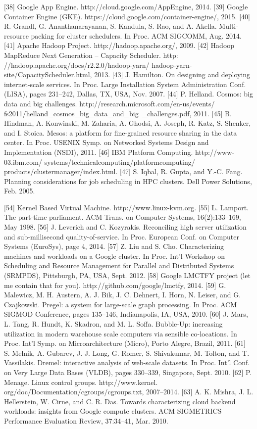 [38] Google App Engine.
http://cloud.google.com/AppEngine, 2014.
[39] Google Container Engine (GKE).
https://cloud.google.com/container-engine/,
2015.
[40] R. Grandl, G. Ananthanarayanan, S. Kandula, S. Rao, and
A. Akella. Multi-resource packing for cluster schedulers. In
Proc. ACM SIGCOMM, Aug. 2014.
[41] Apache Hadoop Project. http://hadoop.apache.org/,
2009.
[42] Hadoop MapReduce Next Generation – Capacity Scheduler.
http:
//hadoop.apache.org/docs/r2.2.0/hadoop-yarn/
hadoop-yarn-site/CapacityScheduler.html, 2013.
[43] J. Hamilton. On designing and deploying internet-scale
services. In Proc. Large Installation System Administration
Conf. (LISA), pages 231–242, Dallas, TX, USA, Nov. 2007.
[44] P. Helland. Cosmos: big data and big challenges.
http://research.microsoft.com/en-us/events/
fs2011/helland\_cosmos\_big\_data\_and\_big\
_challenges.pdf, 2011.
[45] B. Hindman, A. Konwinski, M. Zaharia, A. Ghodsi,
A. Joseph, R. Katz, S. Shenker, and I. Stoica. Mesos: a
platform for fine-grained resource sharing in the data center.
In Proc. USENIX Symp. on Networked Systems Design and
Implementation (NSDI), 2011.
[46] IBM Platform Computing. http://www-03.ibm.com/
systems/technicalcomputing/platformcomputing/
products/clustermanager/index.html.
[47] S. Iqbal, R. Gupta, and Y.-C. Fang. Planning considerations
for job scheduling in HPC clusters. Dell Power Solutions,
Feb. 2005.

[54] Kernel Based Virtual Machine.
http://www.linux-kvm.org.
[55] L. Lamport. The part-time parliament. ACM Trans. on
Computer Systems, 16(2):133–169, May 1998.
[56] J. Leverich and C. Kozyrakis. Reconciling high server
utilization and sub-millisecond quality-of-service. In Proc.
European Conf. on Computer Systems (EuroSys), page 4,
2014.
[57] Z. Liu and S. Cho. Characterizing machines and workloads
on a Google cluster. In Proc. Int’l Workshop on Scheduling
and Resource Management for Parallel and Distributed
Systems (SRMPDS), Pittsburgh, PA, USA, Sept. 2012.
[58] Google LMCTFY project (let me contain that for you).
http://github.com/google/lmctfy, 2014.
[59] G. Malewicz, M. H. Austern, A. J. Bik, J. C. Dehnert,
I. Horn, N. Leiser, and G. Czajkowski. Pregel: a system for
large-scale graph processing. In Proc. ACM SIGMOD
Conference, pages 135–146, Indianapolis, IA, USA, 2010.
[60] J. Mars, L. Tang, R. Hundt, K. Skadron, and M. L. Soffa.
Bubble-Up: increasing utilization in modern warehouse scale
computers via sensible co-locations. In Proc. Int’l Symp. on
Microarchitecture (Micro), Porto Alegre, Brazil, 2011.
[61] S. Melnik, A. Gubarev, J. J. Long, G. Romer, S. Shivakumar,
M. Tolton, and T. Vassilakis. Dremel: interactive analysis of
web-scale datasets. In Proc. Int’l Conf. on Very Large Data
Bases (VLDB), pages 330–339, Singapore, Sept. 2010.
[62] P. Menage. Linux control groups. http://www.kernel.
org/doc/Documentation/cgroups/cgroups.txt,
2007–2014.
[63] A. K. Mishra, J. L. Hellerstein, W. Cirne, and C. R. Das.
Towards characterizing cloud backend workloads: insights
from Google compute clusters. ACM SIGMETRICS
Performance Evaluation Review, 37:34–41, Mar. 2010.

